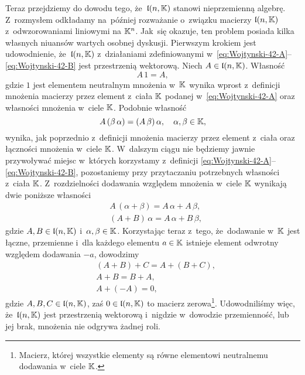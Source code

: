 \documentclass[a4paper,11pt]{article}
\begin{document}
Teraz przejdziemy do dowodu tego, że~$\mathfrak{l}( n, \mathbb{K} )$ stanowi
nieprzemienną algebrę. Z~rozmysłem odkładamy na~później rozważanie
o~związku macierzy $\mathfrak{l}( n, \mathbb{K} )$ z~odwzorowaniami liniowymi na
$\mathbb{K}^{ n }$. Jak~się okazuje, ten problem posiada kilka własnych niuansów
wartych osobnej dyskusji. Pierwszym krokiem jest udowodnienie,
że~$\mathfrak{l}( n, \mathbb{K} )$ z~działaniami zdefiniowanymi
w~\eqref{eq:Wojtynski-42-A}--\eqref{eq:Wojtynski-42-B} jest przestrzenią
wektorową. Niech $A \in \mathfrak{l}( n, \mathbb{K} )$. Własność
\begin{equation}
  \label{eq:Wojtynski-45}
  A \, 1 = A,
\end{equation}
gdzie $1$ jest elementem neutralnym mnożenia w~$\mathbb{K}$ wynika wprost
z~definicji mnożenia macierzy przez element z~ciała $\mathbb{K}$ podanej
w~\eqref{eq:Wojtynski-42-A} oraz własności mnożenia w~ciele $\mathbb{K}$.
Podobnie własność
\begin{equation}
  \label{eq:Wojtynski-46}
  A \, ( \beta \, \alpha ) = ( A \, \beta ) \, \alpha, \quad \alpha, \beta \in \mathbb{K},
\end{equation}
wynika, jak poprzednio z~definicji mnożenia macierzy przez element z~ciała
oraz łączności mnożenia w~ciele $\mathbb{K}$. W~dalszym ciągu nie będziemy jawnie
przywoływać miejsc w~których korzystamy z~definicji
\eqref{eq:Wojtynski-42-A}--\eqref{eq:Wojtynski-42-B}, pozostaniemy przy
przytaczaniu potrzebnych własności z~ciała $\mathbb{K}$. Z~rozdzielności dodawania
względem mnożenia w~ciele $\mathbb{K}$ wynikają dwie poniższe własności
\begin{subequations}
  \begin{align}
    \label{eq:Wojtynski-47-A}
    &A \, ( \alpha + \beta ) = A \, \alpha + A \, \beta, \\
    \label{eq:Wojtynski-47-B}
    &( A + B ) \, \alpha = A \, \alpha + B \, \beta,
  \end{align}
\end{subequations}
gdzie $A, B \in \mathfrak{l}( n, \mathbb{K} )$ i~$\alpha, \beta \in \mathbb{K}$. Korzystając teraz
z~tego, że~dodawanie w~$\mathbb{K}$ jest łączne, przemienne i~dla każdego
elementu $a \in \mathbb{K}$ istnieje element odwrotny względem dodawania $-a$,
dowodzimy
\begin{subequations}
  \begin{align}
    \label{eq:Wojtynski-48-A}
    &( A + B ) + C = A + ( B + C ), \\
    \label{eq:Wojtynski-48-B}
    &A + B = B + A, \\
    \label{eq:Wojtynski-48-C}
    &A + ( -A ) = 0,
  \end{align}
\end{subequations}
gdzie $A, B, C \in \mathfrak{l}( n, \mathbb{K} )$, zaś $0 \in \mathfrak{l}( n, \mathbb{K} )$ to
macierz zerowa\footnote{Macierz, której wszystkie elementy są równe
  elementowi neutralnemu dodawania w~ciele $\mathbb{K}$.}. Udowodniliśmy więc,
że~$\mathfrak{l}( n, \mathbb{K} )$ jest przestrzenią wektorową i~nigdzie w~dowodzie
przemienność, lub jej brak, mnożenia nie odgrywa żadnej roli.
\end{document}
